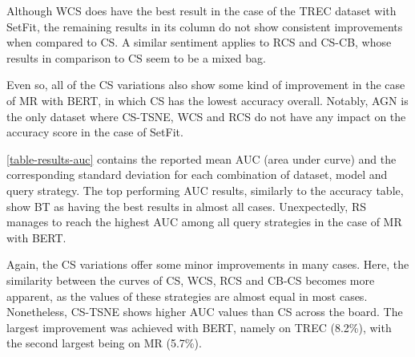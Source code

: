 \documentclass[english,bachelor,ul]{webisthesis} %
\begin{document}
Although WCS does have the best result in the case of the TREC dataset with SetFit, the remaining results in its column do not show consistent improvements when compared to CS. A similar sentiment applies to RCS and CS-CB, whose results in comparison to CS seem to be a mixed bag. 

Even so, all of the CS variations also show some kind of improvement in the case of MR with BERT, in which CS has the lowest accuracy overall. Notably, AGN is the only dataset where CS-TSNE, WCS and RCS do not have any impact on the accuracy score in the case of SetFit.

\ref{table-results-auc} contains the reported mean AUC (area under curve) and the corresponding standard deviation for each combination of dataset, model and query strategy. The top performing AUC results, similarly to the accuracy table, show BT as having the best results in almost all cases. Unexpectedly, RS manages to reach the highest AUC among all query strategies in the case of MR with BERT.

Again, the CS variations offer some minor improvements in many cases. Here, the similarity between the curves of CS, WCS, RCS and CB-CS becomes more apparent, as the values of these strategies are almost equal in most cases. Nonetheless, CS-TSNE shows higher AUC values than CS across the board. The largest improvement was achieved with BERT, namely on TREC (8.2\%), with the second largest being on MR (5.7\%).
\end{document}
